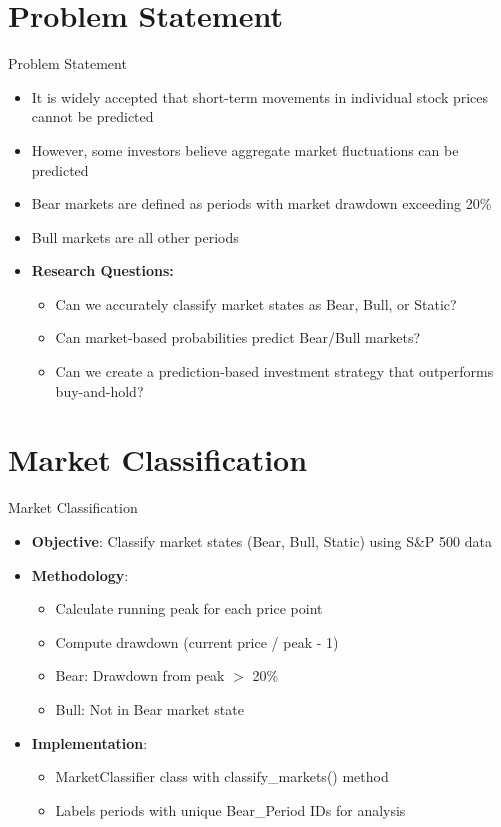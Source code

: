 \documentclass[aspectratio=169,xcolor=dvipsnames]{beamer}
\begin{document}
\section{Problem Statement}
\begin{frame}{Problem Statement}
    \begin{itemize}
        \item It is widely accepted that short-term movements in individual stock prices cannot be predicted
        \item However, some investors believe aggregate market fluctuations can be predicted
        \item Bear markets are defined as periods with market drawdown exceeding 20\%
        \item Bull markets are all other periods
        \item \textbf{Research Questions:}
              \begin{itemize}
                  \item Can we accurately classify market states as Bear, Bull, or Static?
                  \item Can market-based probabilities predict Bear/Bull markets?
                  \item Can we create a prediction-based investment strategy that outperforms buy-and-hold?
              \end{itemize}
    \end{itemize}
\end{frame}

\section{Market Classification}
\begin{frame}{Market Classification}
    \begin{itemize}
        \item \textbf{Objective}: Classify market states (Bear, Bull, Static) using S\&P 500 data
        \item \textbf{Methodology}:
              \begin{itemize}
                  \item Calculate running peak for each price point
                  \item Compute drawdown (current price / peak - 1)
                  \item Bear: Drawdown from peak $>$ 20\%
                  \item Bull: Not in Bear market state
              \end{itemize}
        \item \textbf{Implementation}:
              \begin{itemize}
                  \item MarketClassifier class with classify\_markets() method
                  \item Labels periods with unique Bear\_Period IDs for analysis
              \end{itemize}
    \end{itemize}
\end{frame}
\end{document}
